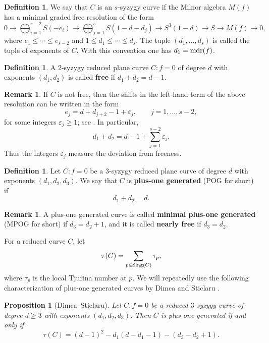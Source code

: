 \documentclass[11pt]{article}
\theoremstyle{plain}
\newtheorem{proposition}[thm]{Proposition}
\theoremstyle{definition}
\newtheorem{definition}[thm]{Definition}
\newtheorem{remark}[thm]{Remark}
\begin{document}
\begin{definition}
We say that $C$ is an $s$-syzygy curve if the Milnor algebra $M(f)$ has a minimal graded free resolution of the form
\[
0 \rightarrow \bigoplus_{i=1}^{s-2}S(-e_i) \rightarrow \bigoplus_{j=1}^{s}S(1-d-d_j) \rightarrow S^3(1-d)\rightarrow S\rightarrow M(f)\rightarrow0,
\]
where $e_1\leq\cdots\leq e_{s-2}$ and $1\leq d_1\leq\cdots\leq d_s$. The tuple $(d_1,\ldots,d_s)$ is called the tuple of exponents of $C$. With this convention one has $d_1={\rm mdr}(f)$.
\end{definition}

\begin{definition}
A $2$-syzygy reduced plane curve $C:f=0$ of degree $d$ with exponents $(d_1,d_2)$ is called \textbf{free} if $d_1+d_2=d-1$.
\end{definition}

\begin{remark} \label{rem:epsilon}
If $C$ is not free, then the shifts in the left-hand term of the above resolution can be written in the form
\[
e_j=d+d_{j+2}-1+\varepsilon_j,\qquad j=1,\ldots,s-2,
\]
for some integers $\varepsilon_j\geq1$; see \cite{Cremona}. In particular,
\[
d_1+d_2=d-1+\sum_{j=1}^{s-2}\varepsilon_j.
\]
Thus the integers $\varepsilon_j$ measure the deviation from freeness.
\end{remark}

\begin{definition}
Let $C:f=0$ be a $3$-syzygy reduced plane curve of degree $d$ with exponents $(d_1,d_2,d_3)$. We say that $C$ is \textbf{plus-one generated} (POG for short) if
\[
d_1+d_2=d.
\]
\end{definition}

\begin{remark}
A plus-one generated curve is called \textbf{minimal plus-one generated} (MPOG for short) if $d_3=d_2+1$, and it is called \textbf{nearly free} if $d_3=d_2$.
\end{remark}

For a reduced curve $C$, let
\begin{equation}
    \tau(C)=\sum_{p\in{\rm Sing}(C)}\tau_p,
    \label{eq:Trurina}
\end{equation}
where $\tau_p$ is the local Tjurina number at $p$. We will repeatedly use the following characterization of plus-one generated curves by Dimca and Sticlaru \cite{DS20}.

\begin{proposition}[Dimca--Sticlaru]
\label{Prop:Tau_POG}
Let $C:f=0$ be a reduced $3$-syzygy curve of degree $d\geq3$ with exponents $(d_1,d_2,d_3)$. Then $C$ is plus-one generated if and only if
\[
\tau(C)=(d-1)^2-d_1(d-d_1-1)-(d_3-d_2+1).
\]
\end{proposition}
\end{document}
